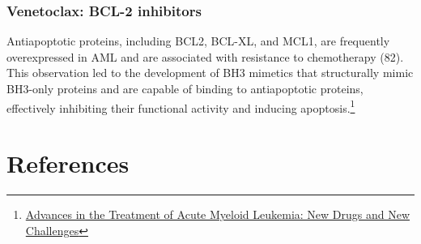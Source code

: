 \documentclass[11pt]{article}
\begin{document}
\hypertarget{venetoclax-bcl-2-inhibitors}{%
\subsubsection{Venetoclax: BCL-2
inhibitors}\label{venetoclax-bcl-2-inhibitors}}

Antiapoptotic proteins, including BCL2, BCL-XL, and MCL1, are frequently
overexpressed in AML and are associated with resistance to chemotherapy
(82). This observation led to the development of BH3 mimetics that
structurally mimic BH3-only proteins and are capable of binding to
antiapoptotic proteins, effectively inhibiting their functional activity
and inducing apoptosis.\footnote{\href{https://aacrjournals.org/cancerdiscovery/article/10/4/506/2495/Advances-in-the-Treatment-of-Acute-Myeloid}{Advances
  in the Treatment of Acute Myeloid Leukemia: New Drugs and New
  Challenges}}
\newpage
    \hypertarget{references}{%
\section{References}\label{references}}
\end{document}
